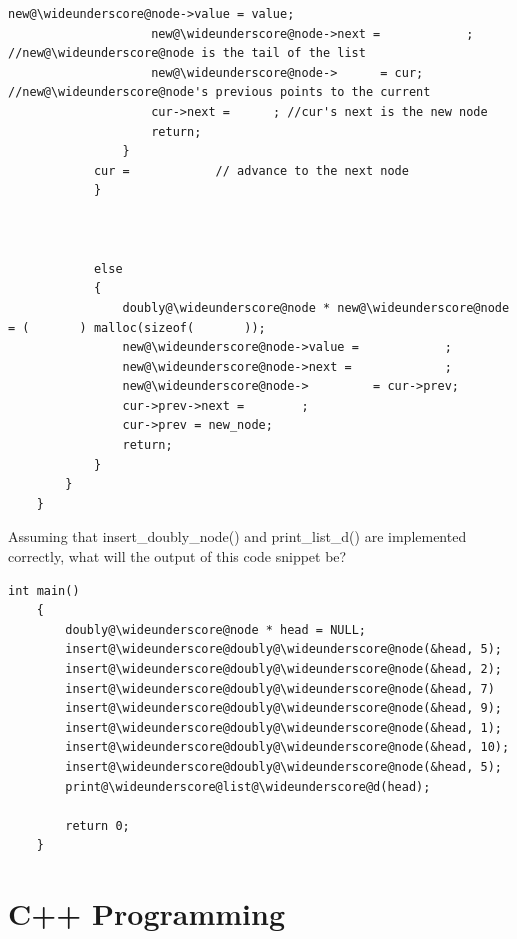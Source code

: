 \documentclass{article}
\begin{document}
\begin{enumerate}[label=(\alph*), itemsep = 120pt]
\begin{lstlisting}[style = CStyle]
                    new@\wideunderscore@node->value = value;
                    new@\wideunderscore@node->next =            ; //new@\wideunderscore@node is the tail of the list
                    new@\wideunderscore@node->      = cur; //new@\wideunderscore@node's previous points to the current
                    cur->next =      ; //cur's next is the new node
                    return;
                }
            cur =            // advance to the next node
            }
        
        

            else 
            {
                doubly@\wideunderscore@node * new@\wideunderscore@node = (       ) malloc(sizeof(       ));
                new@\wideunderscore@node->value =            ;
                new@\wideunderscore@node->next =             ;
                new@\wideunderscore@node->         = cur->prev;
                cur->prev->next =        ;
                cur->prev = new_node;
                return;
            }
        }
    }
\end{lstlisting}

Assuming that insert\_doubly\_node() and print\_list\_d() are implemented correctly, what will the output of this code snippet be? 

\begin{lstlisting}[style = CStyle]
    int main()
    {
        doubly@\wideunderscore@node * head = NULL;
        insert@\wideunderscore@doubly@\wideunderscore@node(&head, 5);
        insert@\wideunderscore@doubly@\wideunderscore@node(&head, 2);
        insert@\wideunderscore@doubly@\wideunderscore@node(&head, 7)
        insert@\wideunderscore@doubly@\wideunderscore@node(&head, 9);
        insert@\wideunderscore@doubly@\wideunderscore@node(&head, 1);
        insert@\wideunderscore@doubly@\wideunderscore@node(&head, 10);
        insert@\wideunderscore@doubly@\wideunderscore@node(&head, 5);
        print@\wideunderscore@list@\wideunderscore@d(head);

        return 0;
    }
\end{lstlisting}

\end{enumerate}
\newpage
\section{C++ Programming}
\end{document}
